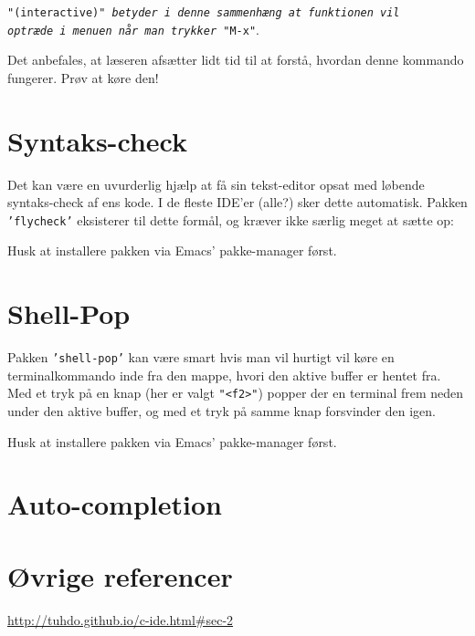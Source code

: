 \documentclass[a4paper, 9pt]{article}
\newcommand{\key}[1]{\texttt{"#1"}}
\newcommand{\package}[1]{\texttt{'#1'}}
\newcommand{\lstline}{\vspace{-3mm}\hrulefill\vspace{2mm}\newline}
\newcommand{\customlisting}[3]{\lstline}
\begin{document}
\vspace{-7mm}\begin{center}\footnotesize\texttt{"(interactive)" \textit{betyder i denne sammenhæng at funktionen vil\\ optræde i menuen når man trykker} \key{M-x}}.\end{center}


Det anbefales, at læseren afsætter lidt tid til at forstå, hvordan denne kommando fungerer. Prøv at køre den!


\newpage
\section{Syntaks-check}
Det kan være en uvurderlig hjælp at få sin tekst-editor opsat med løbende syntaks-check af ens kode. I de fleste IDE'er (alle?) sker dette automatisk. Pakken \package{flycheck} eksisterer til dette formål, og kræver ikke særlig meget at sætte op:

\customlisting{ELisp}{init.el}{activate-flycheck.el}

\noindent
Husk at installere pakken via Emacs' pakke-manager først.


\newpage
\section{Shell-Pop}
Pakken \package{shell-pop} kan være smart hvis man vil hurtigt vil køre en terminalkommando inde fra den mappe, hvori den aktive buffer er hentet fra. Med et tryk på en knap (her er valgt \key{<f2>}) popper der en terminal frem neden under den aktive buffer, og med et tryk på samme knap forsvinder den igen.

\customlisting{ELisp}{init.el}{shell-pop.el}

\noindent
Husk at installere pakken via Emacs' pakke-manager først.

\newpage
\section{Auto-completion}



\newpage
\section{Øvrige referencer}
\url{http://tuhdo.github.io/c-ide.html#sec-2}
\end{document}
